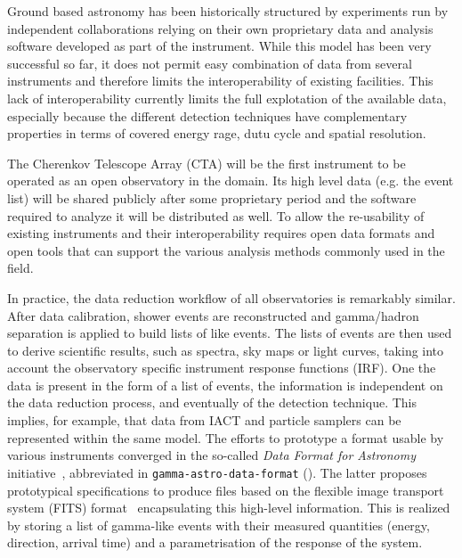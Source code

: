 \documentclass[traditabstract, longauth]{aa}
\begin{document}
Ground based \gammaray astronomy has been historically structured
by experiments run by independent collaborations relying
on their own proprietary data and analysis software developed as part of the
instrument. While this model has been very successful so far, it does not
permit easy combination of data from several instruments and therefore
limits the interoperability of existing facilities. This lack of
interoperability currently limits the full explotation of the
available \gammaray data, especially because the different detection
techniques have complementary properties in terms of covered energy rage,
dutu cycle and spatial resolution.

The Cherenkov Telescope Array (CTA) will be the first instrument to be operated
as an open observatory in the domain. Its high level data (e.g. the event list) will be shared publicly after
some proprietary period and the software required to analyze it will be distributed
as well. To allow the re-usability of existing instruments and their interoperability
requires open data formats and open tools that can support the various analysis methods
commonly used in the field.


In practice, the data reduction workflow of all \gammaray observatories
is remarkably similar. After data calibration, shower events are reconstructed and
gamma/hadron separation is applied to build lists of \gammaray like events.
The lists of \gammaray events are then used to derive scientific results, such as spectra, sky maps
or light curves, taking into account the observatory specific instrument response functions (IRF).
One the data is present in the form of a list of events, the information is independent on
the data reduction process, and eventually of the detection technique. This implies,
for example, that data from IACT and particle samplers can be represented
within the same model. The efforts to prototype a format usable by various instruments
converged in the so-called \textit{Data Format for \gammaray Astronomy}
initiative~\citep{gadf_proc, gadf_universe}, abbreviated in
\texttt{gamma-astro-data-format} (\gadf). The latter proposes prototypical
specifications to produce files based on the flexible image transport system
(FITS) format~\citep{fits} encapsulating this high-level information. This is
realized by storing a list of gamma-like events with their measured quantities
(energy, direction, arrival time) and a parametrisation of the response of the
system.
\end{document}
